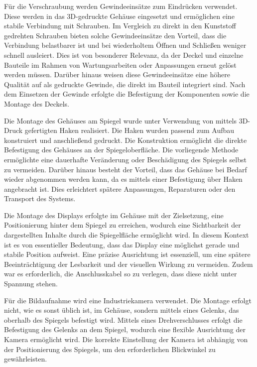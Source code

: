 Für die Verschraubung werden Gewindeeinsätze zum Eindrücken verwendet. Diese werden in das 3D-gedruckte Gehäuse eingesetzt und ermöglichen eine stabile Verbindung mit Schrauben. Im Vergleich zu direkt in den Kunststoff gedrehten Schrauben bieten solche Gewindeeinsätze den Vorteil, dass die Verbindung belastbarer ist und bei wiederholtem Öffnen und Schließen weniger schnell ausleiert. Dies ist von besonderer Relevanz, da der Deckel und einzelne Bauteile im Rahmen von Wartungsarbeiten oder Anpassungen erneut gelöst werden müssen. Darüber hinaus weisen diese Gewindeeinsätze eine höhere Qualität auf als gedruckte Gewinde, die direkt im Bauteil integriert sind. Nach dem Einsetzen der Gewinde erfolgte die Befestigung der Komponenten sowie die Montage des Deckels.

Die Montage des Gehäuses am Spiegel wurde unter Verwendung von mittels 3D-Druck gefertigten Haken realisiert. Die Haken wurden passend zum Aufbau konstruiert und anschließend gedruckt. Die Konstruktion ermöglicht die direkte Befestigung des Gehäuses an der Spiegeloberfläche. Die vorliegende Methode ermöglichte eine dauerhafte Veränderung oder Beschädigung des Spiegels selbst zu vermeiden. Darüber hinaus besteht der Vorteil, dass das Gehäuse bei Bedarf wieder abgenommen werden kann, da es mittels einer Befestigung über Haken angebracht ist. Dies erleichtert spätere Anpassungen, Reparaturen oder den Transport des Systems.

Die Montage des Displays erfolgte im Gehäuse mit der Zielsetzung, eine Positionierung hinter dem Spiegel zu erreichen, wodurch eine Sichtbarkeit der dargestellten Inhalte durch die Spiegelfläche ermöglicht wird. In diesem Kontext ist es von essentieller Bedeutung, dass das Display eine möglichst gerade und stabile Position aufweist. Eine präzise Ausrichtung ist essenziell, um eine spätere Beeinträchtigung der Lesbarkeit und der visuellen Wirkung zu vermeiden. Zudem war es erforderlich, die Anschlusskabel so zu verlegen, dass diese nicht unter Spannung stehen.

Für die Bildaufnahme wird eine Industriekamera verwendet. Die Montage erfolgt nicht, wie es sonst üblich ist, im Gehäuse, sondern mittels eines Gelenks, das oberhalb des Spiegels befestigt wird. Mittels eines Drehverschlusses erfolgt die Befestigung des Gelenks an dem Spiegel, wodurch eine flexible Ausrichtung der Kamera ermöglicht wird. Die korrekte Einstellung der Kamera ist abhängig von der Positionierung des Spiegels, um den erforderlichen Blickwinkel zu gewährleisten.

